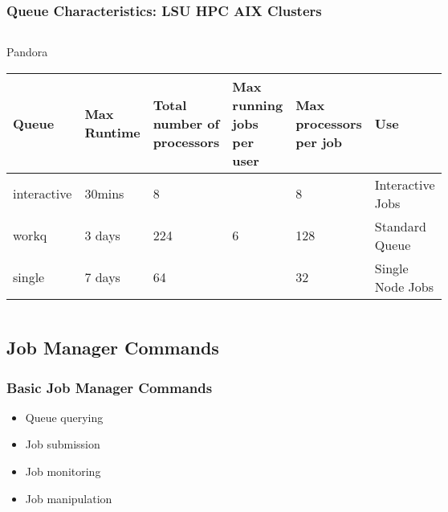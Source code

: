 \documentclass[slidestop,mathserif,compress,xcolor=svgnames,table]{beamer}
\newenvironment{bblock}[0]
{
\begin{beamerboxesrounded}[upper=uppercol1,lower=lowercol1,shadow=true]}
{\end{beamerboxesrounded}}
\begin{document}
\begin{frame}
\frametitle{\small Queue Characteristics: LSU HPC AIX Clusters}
\begin{columns}
\column{12cm}
\begin{bblock}{Pandora}
{\scriptsize
\begin{center}
\begin{tabular}{|m{}|m{}|m{}|m{}|m{}|m{}|}
\hline
Queue & Max Runtime & Total number of processors & Max running jobs per user & Max processors per job & Use \\
\hline
interactive &  30mins & 8 & \multirow{3}{*}{6} & 8 & Interactive Jobs \\
\cline{1-3}\cline{5-6}
workq & 3 days & 224 & & 128 & Standard Queue\\
\cline{1-3}\cline{5-6}
single & 7 days & 64  &   & 32 & Single Node Jobs  \\
\hline
\end{tabular}
\end{center}
}
\end{bblock}
\end{columns}
\end{frame}

\subsection{Job Manager Commands}
\begin{frame}
\frametitle{\small Basic Job Manager Commands}
\begin{bblock}{}
\begin{itemize}
\item Queue querying
\item Job submission
\item Job monitoring
\item Job manipulation
\end{itemize}
\end{bblock}
\end{frame}
\end{document}
